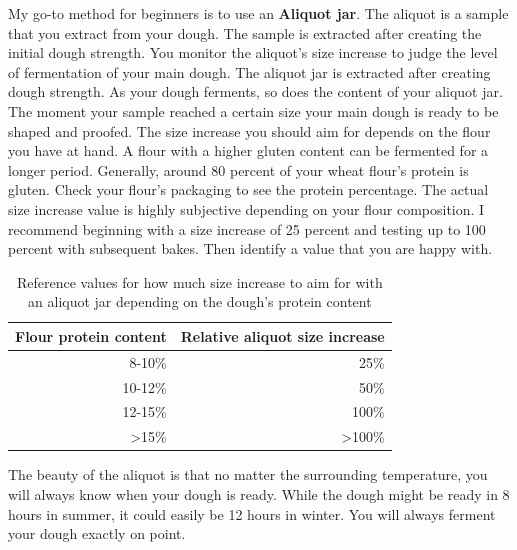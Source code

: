 My go-to method for beginners is to use an \textbf{Aliquot jar}.
The aliquot is a sample that you extract from your dough. The
sample is extracted after creating the initial dough strength.
You monitor the aliquot's size increase to judge the
level of fermentation of your main dough. The aliquot
jar is extracted after creating dough strength. As your
dough ferments, so does the content of your aliquot jar. The moment your
sample reached a certain size your main dough is ready
to be shaped and proofed. The size increase you should
aim for depends on the flour you have at hand. A flour
with a higher gluten content can be fermented for a
longer period. Generally, around 80 percent
of your wheat flour's protein is gluten. Check your flour's
packaging to see the protein percentage. The actual size increase
value is highly subjective depending on your flour composition.
I recommend beginning with a size increase of 25 percent and testing
up to 100 percent with subsequent bakes. Then identify a value
that you are happy with.

\begin{table}[!htb]
  \begin{tabular}{|r|r|}
  \hline
  \multicolumn{1}{|l|}{\textbf{Flour protein content}} & \multicolumn{1}{l|}{\textbf{Relative aliquot size increase}} \\ \hline
  8-10\%                                               & 25\%                                                         \\ \hline
  10-12\%                                              & 50\%                                                         \\ \hline
  12-15\%                                              & 100\%                                                        \\ \hline
  \textgreater 15\%                                    & \textgreater 100\%                                           \\ \hline
  \end{tabular}
  \caption{Reference values for how much size increase to aim for with an aliquot jar depending on the dough's protein content}
\end{table}

The beauty of the aliquot is that no matter the surrounding
temperature, you will always know when your dough is ready.
While the dough might be ready in 8 hours in summer, it could
easily be 12 hours in winter. You will always ferment your
dough exactly on point.



